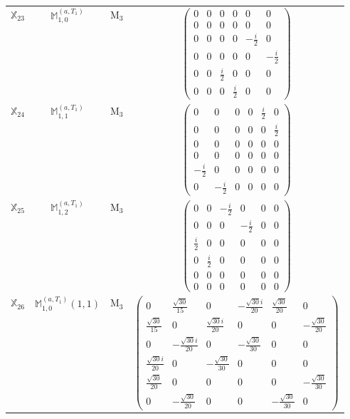 \documentclass[fleqn,10pt,landscape]{article}
\begin{document}
\begin{itemize}
\begin{center}
\begin{longtable}{c|c|c|c}
$ \mathbb{X}_{23} $ & $\mathbb{M}_{1,0}^{(a,T_{1})}$ & M$_{3}$ & $\begin{pmatrix} 0 & 0 & 0 & 0 & 0 & 0 \\ 0 & 0 & 0 & 0 & 0 & 0 \\ 0 & 0 & 0 & 0 & - \frac{i}{2} & 0 \\ 0 & 0 & 0 & 0 & 0 & - \frac{i}{2} \\ 0 & 0 & \frac{i}{2} & 0 & 0 & 0 \\ 0 & 0 & 0 & \frac{i}{2} & 0 & 0 \end{pmatrix}$ \\
$ \mathbb{X}_{24} $ & $\mathbb{M}_{1,1}^{(a,T_{1})}$ & M$_{3}$ & $\begin{pmatrix} 0 & 0 & 0 & 0 & \frac{i}{2} & 0 \\ 0 & 0 & 0 & 0 & 0 & \frac{i}{2} \\ 0 & 0 & 0 & 0 & 0 & 0 \\ 0 & 0 & 0 & 0 & 0 & 0 \\ - \frac{i}{2} & 0 & 0 & 0 & 0 & 0 \\ 0 & - \frac{i}{2} & 0 & 0 & 0 & 0 \end{pmatrix}$ \\
$ \mathbb{X}_{25} $ & $\mathbb{M}_{1,2}^{(a,T_{1})}$ & M$_{3}$ & $\begin{pmatrix} 0 & 0 & - \frac{i}{2} & 0 & 0 & 0 \\ 0 & 0 & 0 & - \frac{i}{2} & 0 & 0 \\ \frac{i}{2} & 0 & 0 & 0 & 0 & 0 \\ 0 & \frac{i}{2} & 0 & 0 & 0 & 0 \\ 0 & 0 & 0 & 0 & 0 & 0 \\ 0 & 0 & 0 & 0 & 0 & 0 \end{pmatrix}$ \\
$ \mathbb{X}_{26} $ & $\mathbb{M}_{1,0}^{(a,T_{1})}(1,1)$ & M$_{3}$ & $\begin{pmatrix} 0 & \frac{\sqrt{30}}{15} & 0 & - \frac{\sqrt{30} i}{20} & \frac{\sqrt{30}}{20} & 0 \\ \frac{\sqrt{30}}{15} & 0 & \frac{\sqrt{30} i}{20} & 0 & 0 & - \frac{\sqrt{30}}{20} \\ 0 & - \frac{\sqrt{30} i}{20} & 0 & - \frac{\sqrt{30}}{30} & 0 & 0 \\ \frac{\sqrt{30} i}{20} & 0 & - \frac{\sqrt{30}}{30} & 0 & 0 & 0 \\ \frac{\sqrt{30}}{20} & 0 & 0 & 0 & 0 & - \frac{\sqrt{30}}{30} \\ 0 & - \frac{\sqrt{30}}{20} & 0 & 0 & - \frac{\sqrt{30}}{30} & 0 \end{pmatrix}$ \\

\end{longtable}
\end{center}
\end{itemize}
\end{document}
